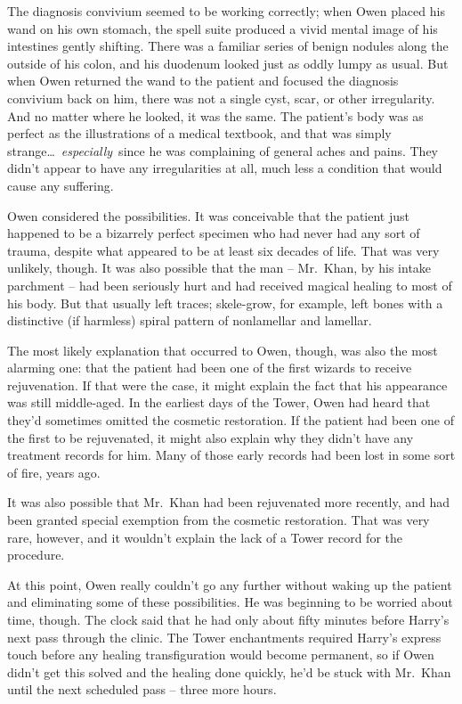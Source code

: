 The diagnosis convivium seemed to be working correctly; when Owen placed
his wand on his own stomach, the spell suite produced a vivid mental
image of his intestines gently shifting. There was a familiar series of
benign nodules along the outside of his colon, and his duodenum looked
just as oddly lumpy as usual. But when Owen returned the wand to the
patient and focused the diagnosis convivium back on him, there was not a
single cyst, scar, or other irregularity. And no matter where he looked,
it was the same. The patient's body was as perfect as the illustrations
of a medical textbook, and that was simply
strange\ldots~\emph{especially}~since he was complaining of general
aches and pains. They didn't appear to have any irregularities at all,
much less a condition that would cause any suffering.

Owen considered the possibilities. It was conceivable that the patient
just happened to be a bizarrely perfect specimen who had never had any
sort of trauma, despite what appeared to be at least six decades of
life. That was very unlikely, though. It was also possible that the man
-- Mr.~Khan, by his intake parchment -- had been seriously hurt and had
received magical healing to most of his body. But that usually left
traces; skele-grow, for example, left bones with a distinctive (if
harmless) spiral pattern of nonlamellar and lamellar.

The most likely explanation that occurred to Owen, though, was also the
most alarming one: that the patient had been one of the first wizards to
receive rejuvenation. If that were the case, it might explain the fact
that his appearance was still middle-aged. In the earliest days of the
Tower, Owen had heard that they'd sometimes omitted the cosmetic
restoration. If the patient had been one of the first to be rejuvenated,
it might also explain why they didn't have any treatment records for
him. Many of those early records had been lost in some sort of fire,
years ago.

It was also possible that Mr.~Khan had been rejuvenated more recently,
and had been granted special exemption from the cosmetic restoration.
That was very rare, however, and it wouldn't explain the lack of a Tower
record for the procedure.

At this point, Owen really couldn't go any further without waking up the
patient and eliminating some of these possibilities. He was beginning to
be worried about time, though. The clock said that he had only about
fifty minutes before Harry's next pass through the clinic. The Tower
enchantments required Harry's express touch before any healing
transfiguration would become permanent, so if Owen didn't get this
solved and the healing done quickly, he'd be stuck with Mr.~Khan until
the next scheduled pass -- three more hours.

